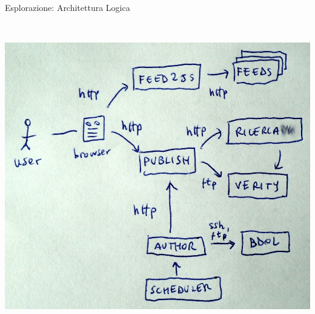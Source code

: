 \documentclass[compress, red, 14pt, pdf]{beamer}
\begin{document}
\begin{frame}{Esplorazione: Architettura Logica}
\begin{columns}[T]
\begin{column}{.5\textwidth}
				\\ \vspace*{0.2cm}
				\hspace*{0.2cm} \includegraphics[scale=0.13]{images/architecture-4}
		    \end{column}
		 \end{columns}
	\end{frame}
\end{document}
